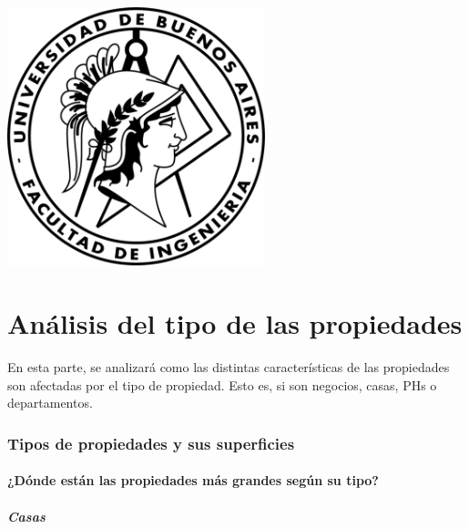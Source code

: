 \documentclass[a4paper, 10pt]{article}
\begin{document}
    \newpage

    \begin{center}
        \includegraphics[width=7.5cm, height=7.5cm]{images/logo}
    \end{center}


    \maketitle
    \newpage
    \tableofcontents
    \newpage
	\part{Análisis del tipo de las propiedades}
		En esta parte, se analizará como las distintas características de las propiedades son afectadas por el tipo de propiedad.
		Esto es, si son negocios, casas, PHs o departamentos.
		\section{Tipos de propiedades y sus superficies}
			\subsection{¿Dónde están las propiedades más grandes según su tipo?}
				\subsubsection{Casas}
\end{document}
